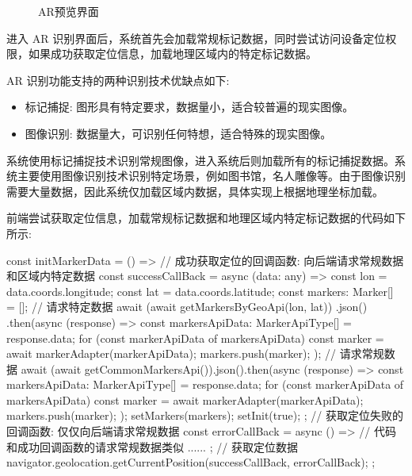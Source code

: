 \begin{figure}[H]
  \caption{AR预览界面}
  \label{fig:AR预览界面}
\end{figure}

进入 AR 识别界面后，系统首先会加载常规标记数据，同时尝试访问设备定位权限，如果成功获取定位信息，加载地理区域内的特定标记数据。

AR 识别功能支持的两种识别技术优缺点如下:
\begin{itemize}
  \item 标记捕捉: 图形具有特定要求，数据量小，适合较普遍的现实图像。
  \item 图像识别: 数据量大，可识别任何特想，适合特殊的现实图像。
\end{itemize}

系统使用标记捕捉技术识别常规图像，进入系统后则加载所有的标记捕捉数据。系统主要使用图像识别技术识别特定场景，例如图书馆，名人雕像等。由于图像识别需要大量数据，因此系统仅加载区域内数据，具体实现上根据地理坐标加载。

前端尝试获取定位信息，加载常规标记数据和地理区域内特定标记数据的代码如下所示:

\begin{JavaScript}
const initMarkerData = () => {
  // 成功获取定位的回调函数: 向后端请求常规数据和区域内特定数据
  const successCallBack = async (data: any) => {
    const lon = data.coords.longitude;
    const lat = data.coords.latitude;
    const markers: Marker[] = [];
    // 请求特定数据
    await (await getMarkersByGeoApi(lon, lat))
    .json()
    .then(async (response) => {
      const markersApiData: MarkerApiType[] = response.data;
      for (const markerApiData of markersApiData) {
        const marker = await markerAdapter(markerApiData);
        markers.push(marker);
        }
        });
    // 请求常规数据
    await (await getCommonMarkersApi()).json().then(async (response) => {
      const markersApiData: MarkerApiType[] = response.data;
      for (const markerApiData of markersApiData) {
        const marker = await markerAdapter(markerApiData);
        markers.push(marker);
      }
    });
    setMarkers(markers);
    setInit(true);
  };
  // 获取定位失败的回调函数: 仅仅向后端请求常规数据
  const errorCallBack = async () => {
    // 代码和成功回调函数的请求常规数据类似
    ......
  };
  // 获取定位数据
  navigator.geolocation.getCurrentPosition(successCallBack, errorCallBack);
};
\end{JavaScript}

